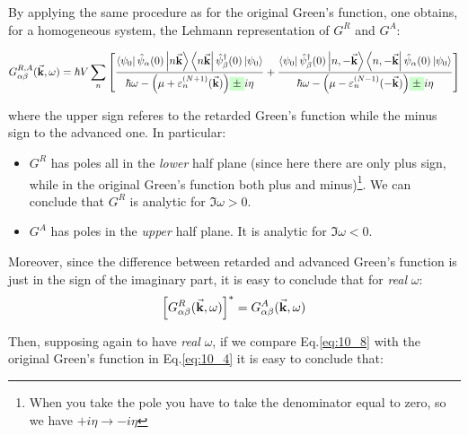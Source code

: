 \documentclass[../main/main.tex]{subfiles}
\begin{document}
By applying the same procedure as for the original Green's function, one obtains, for a homogeneous system, the Lehmann representation of \( G^R \) and \( G^A \):
\begin{small}
\begin{equation}
  G_{\alpha \beta }^{R,A} (\va{k}, \omega )
  =  \hbar V \sum_{n}^{}
  \qty[
  \frac{\bra{\psi _0} \hat{\psi }_ \alpha
   (0) \ket{ n \va{k}} \bra{n \va{k}} \hat{\psi }_ \beta ^\dag (0) \ket{\psi _0}  }{ \hbar \omega - \qty( \mu + \varepsilon _n^{(N+1)}(\va{k})) \mathcolorbox{green!20}{\pm} i \eta }
   +
  \frac{\bra{\psi _0} \hat{\psi }_ \beta ^\dag (0) \ket{n, -\va{k}} \bra{n, -\va{k}}  \hat{\psi }_ \alpha
  (0)  \ket{\psi _0}  }{  \hbar \omega - \qty( \mu - \varepsilon _n^{(N-1)} (-\va{k})) \mathcolorbox{green!20}{\pm} i \eta } ]
  \label{eq:10_8}
\end{equation}
\end{small}
where the upper sign referes to the retarded Green's function while the minus sign to the advanced one. In particular:
\begin{itemize}
\item \( G^R \) has poles all in the \emph{lower} half plane (since here there are only plus sign, while in the original Green's function both plus and minus)\footnote{When you take the pole you have to take the denominator equal to zero, so we have \( + i \eta \rightarrow -i \eta  \)}. We can conclude that \( G^R \) is analytic for \( \Im \omega  >0 \).

\item \( G^A \) has poles in the \emph{upper} half plane. It is analytic for \( \Im \omega <0 \).
\end{itemize}
Moreover, since the difference between retarded and advanced Green's function is just in the sign of the imaginary part,  it is easy to conclude that for \emph{real} \( \omega  \):
\begin{equation*}
  \qty[ G_{\alpha \beta }^R (\va{k}, \omega )]^* = G_{\alpha \beta }^A (\va{k}, \omega)
\end{equation*}

Then, supposing again to have \emph{real} \( \omega  \), if we compare Eq.\eqref{eq:10_8} with the original Green's function in Eq.\eqref{eq:10_4} it is easy to conclude that:
\end{document}
